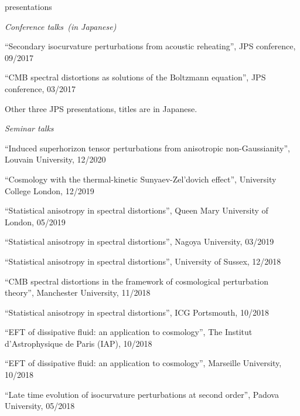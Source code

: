 \documentclass[a4paper]{resume} %
\begin{document}
\begin{rSection}{presentations}
\begin{etaremune}
        
\end{etaremune}

\noindent\textit{Conference talks~(in Japanese)}

\begin{etaremune}
    \item 
    ``Secondary isocurvature perturbations from acoustic reheating'', JPS conference, 09/2017
    \item
    ``CMB spectral distortions as solutions of the Boltzmann equation'', JPS conference, 03/2017
    \item
    Other three JPS presentations, titles are in Japanese.
\end{etaremune}


\noindent\textit{Seminar talks}

\begin{etaremune}

	\item
	``Induced superhorizon tensor perturbations from anisotropic non-Gaussianity'', Louvain University, 12/2020
	\item
	``Cosmology with the thermal-kinetic Sunyaev-Zel'dovich effect'', University College London, 12/2019
	\item
    ``Statistical anisotropy in spectral distortions'', Queen Mary University of London, 05/2019
	\item
    ``Statistical anisotropy in spectral distortions'', Nagoya University, 03/2019
    \item
    ``Statistical anisotropy in spectral distortions'', University of Sussex, 12/2018
    \item
    ``CMB spectral distortions in the framework of cosmological perturbation theory'', Manchester University, 11/2018
    
    \item
    ``Statistical anisotropy in spectral distortions'', ICG Portsmouth, 10/2018

    \item
    ``EFT of dissipative fluid: an application to cosmology'', The Institut d'Astrophysique de Paris (IAP), 10/2018

    \item
    ``EFT of dissipative fluid: an application to cosmology'', Marseille University, 10/2018

    \item
    ``Late time evolution of isocurvature perturbations at second order'', Padova University, 05/2018


\end{etaremune}
\end{rSection}
\end{document}
